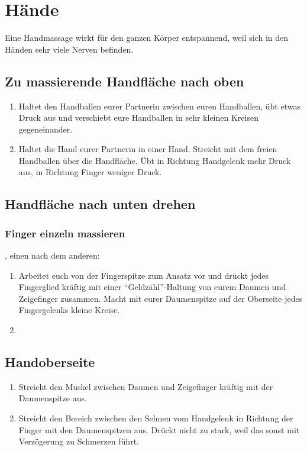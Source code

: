 \section{Hände}

Eine Handmassage wirkt für den ganzen Körper entspannend, weil sich in den Händen sehr viele Nerven befinden.

\subsection{Zu massierende Handfläche nach oben}
\begin{enumerate}
  \item {} Haltet den Handballen eurer Partnerin zwischen euren Handballen, übt etwas Druck aus und verschiebt eure Handballen in sehr kleinen Kreisen gegeneinander.
  \item {} Haltet die Hand eurer Partnerin in einer Hand. Streicht mit dem freien Handballen über die Handfläche. Übt in Richtung Handgelenk mehr Druck aus, in Richtung Finger weniger Druck.
\end{enumerate}


\subsection{Handfläche nach unten drehen}

\subsubsection{Finger einzeln massieren}

\begin{oframed}
  , einen nach dem anderen:
  \begin{enumerate}
    \item {} Arbeitet euch von der Fingerspitze zum Ansatz vor und drückt jedes Fingerglied kräftig mit einer "`Geldzähl"'-Haltung von eurem Daumen und Zeigefinger zusammen. Macht mit eurer Daumenspitze auf der Oberseite jedes Fingergelenks kleine Kreise.
    \item {}
  \end{enumerate}
\end{oframed}

\subsection{Handoberseite}
\begin{enumerate}
  \item {} Streicht den Muskel zwischen Daumen und Zeigefinger kräftig mit der Daumenspitze aus.
  \item {} Streicht den Bereich zwischen den Sehnen vom Handgelenk in Richtung der Finger  mit den Daumenspitzen aus. Drückt nicht zu stark, weil das sonst mit Verzögerung zu Schmerzen führt.
\end{enumerate}

